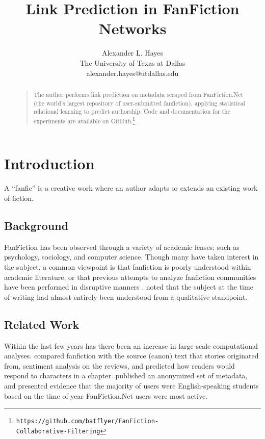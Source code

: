 \documentclass[letterpaper]{article}
\begin{document}
%
\title{Link Prediction in FanFiction Networks}
\author{Alexander L. Hayes\\
The University of Texas at Dallas\\
alexander.hayes@utdallas.edu\\
}

\maketitle
\begin{abstract}
\begin{quote}
The author performs link prediction on metadata scraped from FanFiction.Net (the world's largest repository of user-submitted fanfiction), applying statistical relational learning to predict authorship. Code and documentation for the experiments are available on GitHub.\footnote{\texttt{https://github.com/batflyer/FanFiction-\\Collaborative-Filtering}}
\end{quote}
\end{abstract}

\section{Introduction}
A ``fanfic'' is a creative work where an author adapts or extends an existing work of fiction.

\subsection{Background}

FanFiction has been observed through a variety of academic lenses; such as psychology, sociology, and computer science. Though many have taken interest in the subject, a common viewpoint is that fanfiction is poorly understood within academic literature, or that previous attempts to analyze fanfiction communities have been performed in disruptive manners \cite{larsen2011fandom}. \cite{barnes2015fanfiction} noted that the subject at the time of writing had almost entirely been understood from a qualitative standpoint.

\subsection{Related Work}

Within the last few years has there been an increase in large-scale computational analyses. \cite{milli2016beyond} compared fanfiction with the source (canon) text that stories originated from, sentiment analysis on the reviews, and predicted how readers would respond to characters in a chapter. \cite{yin2017no} published an anonymized set of metadata, and presented evidence that the majority of users were English-speaking students based on the time of year FanFiction.Net users were most active.
\end{document}

